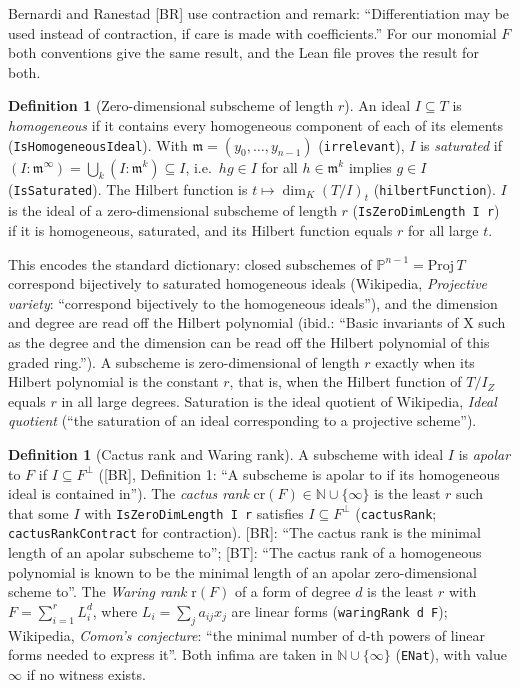\documentclass[11pt]{article}
\theoremstyle{definition}
\newtheorem{definition}[theorem]{Definition}
\begin{document}
Bernardi and Ranestad [BR] use contraction and remark: ``Differentiation may be used instead of
contraction, if care is made with coefficients.'' For our monomial $F$ both conventions give the
same result, and the Lean file proves the result for both.

\begin{definition}[Zero-dimensional subscheme of length $r$]
An ideal $I\subseteq T$ is \emph{homogeneous} if it contains every homogeneous component of each of
its elements (\texttt{IsHomogeneousIdeal}). With $\mathfrak m=(y_0,\dots,y_{n-1})$
(\texttt{irrelevant}), $I$ is \emph{saturated} if $(I:\mathfrak m^\infty)=\bigcup_k(I:\mathfrak
m^k)\subseteq I$, i.e.\ $h g\in I$ for all $h\in\mathfrak m^k$ implies $g\in I$
(\texttt{IsSaturated}). The Hilbert function is $t\mapsto\dim_K(T/I)_t$ (\texttt{hilbertFunction}).
$I$ is the ideal of a zero-dimensional subscheme of length $r$ (\texttt{IsZeroDimLength I r}) if it
is homogeneous, saturated, and its Hilbert function equals $r$ for all large $t$.
\end{definition}

This encodes the standard dictionary: closed subschemes of $\mathbb P^{n-1}=\mathrm{Proj}\,T$
correspond bijectively to saturated homogeneous ideals (Wikipedia, \emph{Projective variety}:
``correspond bijectively to the homogeneous ideals''), and the dimension and degree are read off
the Hilbert polynomial (ibid.: ``Basic invariants of X such as the degree and the dimension can be
read off the Hilbert polynomial of this graded ring.''). A subscheme is zero-dimensional of length
$r$ exactly when its Hilbert polynomial is the constant $r$, that is, when the Hilbert function of
$T/I_Z$ equals $r$ in all large degrees. Saturation is the ideal quotient of Wikipedia, \emph{Ideal
quotient} (``the saturation of an ideal corresponding to a projective scheme'').

\begin{definition}[Cactus rank and Waring rank]
A subscheme with ideal $I$ is \emph{apolar} to $F$ if $I\subseteq F^\perp$ ([BR], Definition 1:
``A subscheme is apolar to if its homogeneous ideal is contained in''). The \emph{cactus rank}
$\mathrm{cr}(F)\in\mathbb N\cup\{\infty\}$ is the least $r$ such that some $I$ with
\texttt{IsZeroDimLength I r} satisfies $I\subseteq F^\perp$ (\texttt{cactusRank};
\texttt{cactusRankContract} for contraction). [BR]: ``The cactus rank is the minimal length of an
apolar subscheme to''; [BT]: ``The cactus rank of a homogeneous polynomial is known to be the
minimal length of an apolar zero-dimensional scheme to''. The \emph{Waring rank} $\mathrm r(F)$ of
a form of degree $d$ is the least $r$ with $F=\sum_{i=1}^r L_i^d$, where $L_i=\sum_j a_{ij}x_j$ are
linear forms (\texttt{waringRank d F}); Wikipedia, \emph{Comon's conjecture}: ``the minimal number
of d-th powers of linear forms needed to express it''. Both infima are taken in
$\mathbb N\cup\{\infty\}$ (\texttt{ENat}), with value $\infty$ if no witness exists.
\end{definition}
\end{document}
